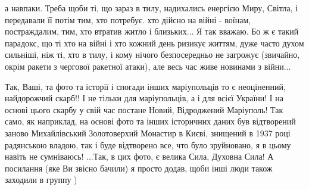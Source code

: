 а навпаки. Треба щоби ті, що зараз в тилу, надихались енергією Миру, Світла, і
передавали її потім тим, хто потребує. хто дійсно на війні - воїнам,
постраждалим, тим, хто втратив житло і близьких... Я так вважаю. Бо ж є такий
парадокс, що ті хто на війні і хто кожний день ризикує життям, дуже часто духом
сильніші, ніж ті, хто в тилу, і кому нічого безпосередньо не загрожує
(звичайно, окрім ракети з чергової ракетної атаки), але весь час живе новинами
з війни... 



Так, Ваші, та фото та історії і спогади інших маріупольців то є неоціненний,
найдорожчий скарб!! І не тільки для маріупольців, а і для всієї України! І на
основі цього скарбу у свій час постане Новий, Відроджений Маріуполь! Так само,
як наприклад, на основі фото та інших історичних даних був відтворений заново
Михайлівський Золотоверхий Монастир в Києві, знищений в 1937 році радянською
владою, так і буде відтворено все, что було зруйновано, я в цьому навіть не
сумніваюсь! ...Так, в цих фото, є велика Сила, Духовна Сила! А посилання (яке
Ви звісно бачили) я просто додав, щоби інші люди також заходили в группу )
